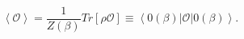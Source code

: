 \begin{equation}
\left\langle {\mathcal O}\right\rangle =\frac{1}{Z\left( \beta \right) }
Tr\left[ \rho {\mathcal O}\right] \equiv \left\langle 0\left( \beta \right)
\left| {\mathcal O}\right| 0\left(\beta \right) \right\rangle. \label {BS} 
\end{equation}

